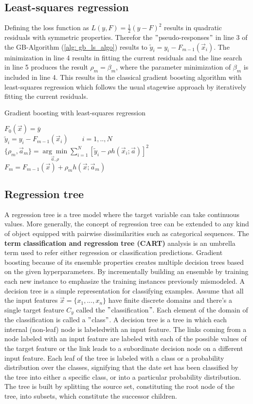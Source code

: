 \documentclass[12pt, a4paper]{article}
\begin{document}
\subsection{Least-squares regression}
Defining the loss function as $L(y,F) = \frac{1}{2} (y - F)^2$ results in quadratic residuals with symmetric properties. Therefor the $"$pseudo-responses$"$ in line 3 of the GB-Algorithm (\ref{alg: gb_ls_algo}) results to $\tilde{y}_i = y_i - F_{m-1}(\vec{x}_i)$. The minimization in line 4 results in fitting the current residuals and the line search in line 5 produces the result $\rho_m = \beta_m$, where the parameter minimization of $\beta_m$ is included in line 4. This results in the classical gradient boosting algorithm with least-squares regression which follows the usual stagewise approach by iteratively fitting the current residuals.
\begin{algorithm}
\caption{Gradient boosting with least-squares regression}
\label{alg: gb_ls_algo}
    $F_0(\vec{x}) = \bar{y}$ \\
    {
    $\tilde{y}_i = y_i - F_{m-1}(\vec{x}_i) \qquad i = 1,..,N$
    $\{\rho_m, \vec{a}_m \} = \underset{ \vec{a}, \rho }{\arg\min} 
    \sum_{i=1}^N [\tilde{y}_i - \rho h(\vec{x}_i;\vec{a})]^2$
    $F_{m} = F_{m-1}(\vec{x}) + \rho_m h(\vec{x};\vec{a}_m)$
    }
\end{algorithm}

\newpage
\subsection{Regression tree}

A regression tree is a tree model where the target variable can take continuous values. More generally, the concept of regression tree can be extended to any kind of object equipped with pairwise dissimilarities such as categorical sequences. The \textbf{term classification and regression tree (CART)} analysis is an umbrella term used to refer either regression or classification predictions. Gradient boosting because of its ensemble properties creates multiple decision trees based on the given hyperparameters. By incrementally building an ensemble by training each new instance to emphasize the training instances previously mismodeled. 
A decision tree is a simple representation for classifying examples. Assume that all the input features $\vec{x} = \{x_1,...,x_n\}$ have finite discrete domains and there's a single target feature $C_y$ called the $"$classification$"$. 
Each element of the domain of the classification is called a $"$class$"$. A decision tree is a tree in which each internal (non-leaf) node is labeledwith an input feature. The links coming from a node labeled with an input feature are labeled with each of the possible values of the target feature or the link leads to a subordinate decision node on a different input feature. Each leaf of the tree is labeled with a class or a probability distribution over the classes, signifying that the date set has been classified by the tree into either a specific class, or into a particular probability distribution. 
The tree is built by splitting the source set, constituting the root node of the tree, into subsets, which constitute the successor children.
\end{document}
